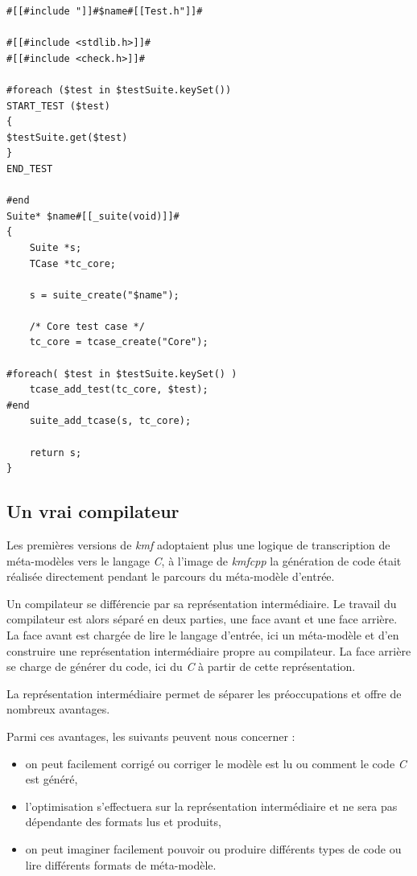 \begin{lstlisting}[frame=single, label={velocity}]
#[[#include "]]#$name#[[Test.h"]]#

#[[#include <stdlib.h>]]#
#[[#include <check.h>]]#

#foreach ($test in $testSuite.keySet())
START_TEST ($test)
{
$testSuite.get($test)
}
END_TEST

#end
Suite* $name#[[_suite(void)]]#
{
	Suite *s;
	TCase *tc_core;

	s = suite_create("$name");

	/* Core test case */
	tc_core = tcase_create("Core");

#foreach( $test in $testSuite.keySet() )
	tcase_add_test(tc_core, $test);
#end
	suite_add_tcase(s, tc_core);

	return s;
}
\end{lstlisting}

\subsection{Un vrai compilateur}

Les premières versions de \emph{kmf} adoptaient plus une logique de transcription de méta-modèles vers le langage \emph{C}, à l'image de \emph{kmfcpp} la génération de code était réalisée directement pendant le parcours du méta-modèle d'entrée.

Un compilateur se différencie par sa représentation intermédiaire. Le travail du compilateur est alors séparé en deux parties, une face avant et une face arrière. La face avant est chargée de lire le langage d'entrée, ici un méta-modèle et d'en construire une représentation intermédiaire propre au compilateur. La face arrière se charge de générer du code, ici du \emph{C} à partir de cette représentation.

La représentation intermédiaire permet de séparer les préoccupations et offre de nombreux avantages.

Parmi ces avantages, les suivants peuvent nous concerner :
\begin{itemize}
\item on peut facilement corrigé ou corriger le modèle est lu ou comment le code \emph{C} est généré,
\item l'optimisation s'effectuera sur la représentation intermédiaire et ne sera pas dépendante des formats lus et produits,
\item on peut imaginer facilement pouvoir ou produire différents types de code ou lire différents formats de méta-modèle.
\end{itemize}

